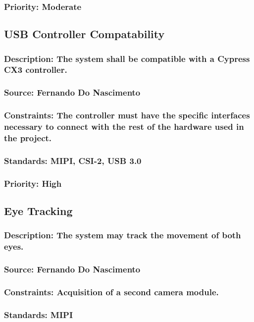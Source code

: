 \subsubsection{Priority: Moderate}

\subsection{USB Controller Compatability}
\subsubsection{Description: The system shall be compatible with a Cypress CX3 controller.}
\subsubsection{Source: Fernando Do Nascimento}
\subsubsection{Constraints: The controller must have the specific interfaces necessary to connect with the rest of the hardware used in the project.}
\subsubsection{Standards: MIPI, CSI-2, USB 3.0}
\subsubsection{Priority: High}

\subsection{Eye Tracking}
\subsubsection{Description: The system may track the movement of both eyes.}
\subsubsection{Source: Fernando Do Nascimento}
\subsubsection{Constraints: Acquisition of a second camera module.}
\subsubsection{Standards: MIPI}
